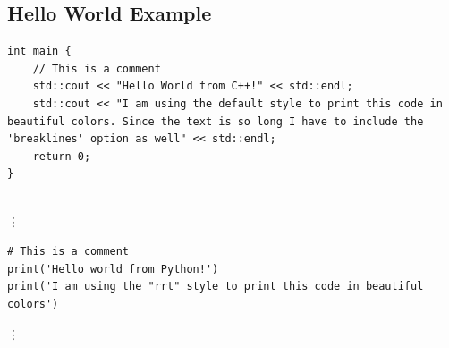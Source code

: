 


\subsection{Hello World Example}

\begin{verbatim}
int main {
    // This is a comment
    std::cout << "Hello World from C++!" << std::endl;
    std::cout << "I am using the default style to print this code in beautiful colors. Since the text is so long I have to include the 'breaklines' option as well" << std::endl;
    return 0;
}
 
\end{verbatim}

\vdots

\begin{verbatim}
# This is a comment
print('Hello world from Python!')
print('I am using the "rrt" style to print this code in beautiful colors')
\end{verbatim}

\vdots

\inputminted[breaklines]{Matlab}{./Code/HelloWorld.m}

